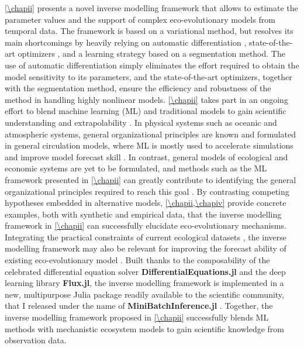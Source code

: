 %
\cref{\chapii} presents a novel inverse modelling framework that allows to estimate the parameter values and the support of complex eco-evolutionary models from temporal data.
% 
The framework is based on a variational method, but resolves its main shortcomings by heavily relying on automatic differentiation \citep{Rackauckas2020a}, state-of-the-art optimizers \citep{Kingma2014}, and a learning strategy based on a segmentation method. 
% 
The use of automatic differentiation simply eliminates the effort required to obtain the model sensitivity to its parameters, and the state-of-the-art optimizers, together with the segmentation method, ensure the efficiency and robustness of the method in handling highly nonlinear models.
% 
\cref{\chapii} takes part in an ongoing effort to blend machine learning (ML) and traditional models to gain scientific understanding and extrapolability \citep{Karpatne2017,Rackauckas2020a,Schneider2017,Rolnick2023,Kashinath2021,Yazdani2020,Raissi2019}. 
% 
In physical systems such as oceanic and atmospheric systems, general organizational principles are known and formulated in general circulation models, where ML is mostly used to accelerate simulations \citep{Kashinath2021} and improve model forecast skill \citep{Schneider2017}. In contrast, general models of ecological and economic systems are yet to be formulated, and methods such as the ML framework presented in \cref{\chapii} can greatly contribute to identifying the general organizational principles required to reach this goal \citep{Karpatne2017}. 
% 
By contrasting competing hypotheses embedded in alternative models, \cref{\chapii,\chapiv} provide concrete examples, both with synthetic and empirical data, that the inverse modelling framework in \cref{\chapii} can successfully elucidate eco-evolutionary mechanisms.
Integrating the practical constraints of current ecological datasets \citep{Dornelas2018}, the inverse modelling framework may also be relevant for improving the forecast ability of existing eco-evolutionary model \citep{Norberg2012}.
% 
Built thanks to the composability of the celebrated differential equation solver \textbf{DifferentialEquations.jl} and the deep learning library \textbf{Flux.jl}, the inverse modelling framework is implemented in a new, multipurpose Julia package readily available to the scientific community, that I released under the name of \textbf{MiniBatchInference.jl} \citep{MiniBatchInference}.
% 
Together, the inverse modelling framework proposed in \cref{\chapii} successfully blends ML methods with mechanistic ecosystem models to gain scientific knowledge from observation data. 

